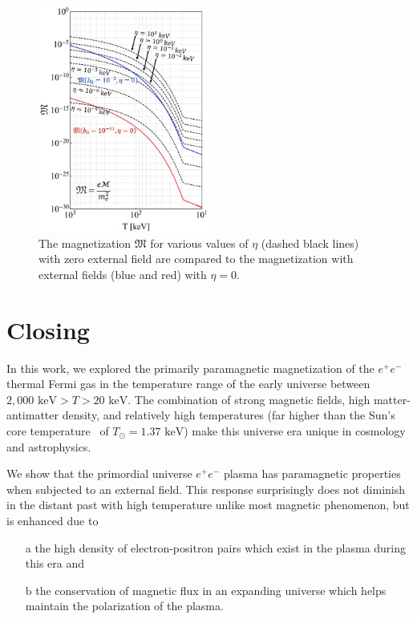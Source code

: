 \documentclass[a4paper]{article}
\newcommand*{\keV}{\text{ keV}}
\begin{document}
\begin{figure}[ht]
    \centering
    \includegraphics[width=0.5\textwidth]{plots/SpinPolarizationEffect_04.jpg}
    \caption{The magnetization ${\mathfrak M}$ for various values of $\eta$ (dashed black lines) with zero external field are compared to the magnetization with external fields (blue and red) with $\eta=0$.}
    \label{fig:ferro} 
\end{figure}

\section{Closing}
\label{sec:conclusions}
\noindent In this work, we explored the primarily paramagnetic magnetization of the $e^{+}e^{-}$ thermal Fermi gas in the temperature range of the early universe between $2,000\keV>T>20\keV$. The combination of strong magnetic fields, high matter-antimatter density, and relatively high temperatures (far higher than the Sun's core temperature~\cite{bahcall2001solar} of $T_{\odot}=1.37\keV$) make this universe era unique in cosmology and astrophysics.

We show that the primordial universe $e^{+}e^{-}$ plasma has paramagnetic properties when subjected to an external field. This response surprisingly does not diminish in the distant past with high temperature unlike most magnetic phenomenon, but is enhanced due to
\begin{itemize}
    \item[a] the high density of electron-positron pairs which exist in the plasma during this era and
    \item[b] the conservation of magnetic flux in an expanding universe which helps maintain the polarization of the plasma.
\end{itemize}
\end{document}

